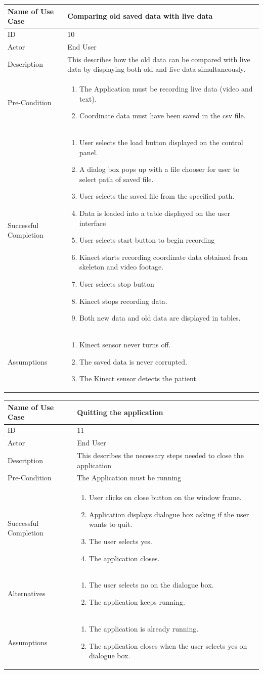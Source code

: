 \documentclass[a4paper, 12pt]{article}
\newcommand\addrow[2]{#1 &#2\\ }
\newcommand\addheading[2]{#1 &#2\\ \hline}
\newcommand\tabularhead{\begin{tabular}{lp{8cm}}
\hline
}
\newcommand\addmulrow[2]{ \begin{minipage}[t][][t]{2.5cm}#1\end{minipage}%
   &\begin{minipage}[t][][t]{8cm}
    \begin{enumerate} #2   \end{enumerate}
    \end{minipage}\\ }
\newenvironment{usecase}{\tabularhead}
{\hline\end{tabular}}
\begin{document}
\begin{usecase}
	\addheading{Name of Use Case}{Comparing old saved data with live data}
	\addrow{ID}{10}
	\addrow{Actor}{End User}
	\addrow{Description}{This describes how the old data can be compared with live data by displaying both old and live data simultaneously.}
	\addmulrow{Pre-Condition}{
	\item The Application must be recording live data (video and text).
	\item Coordinate data must have been saved in the csv file.}							
	\addmulrow{Successful Completion}{
		\item User selects the load button displayed on the control panel. 
		\item A dialog box pops up with a file chooser for user to select path of saved file.
		\item User selects the saved file from the specified path. 
		\item Data is loaded into a table displayed on the user interface
		\item User selects start button to begin recording
		\item Kinect starts recording coordinate data obtained from skeleton and video footage.
		\item User selects stop button
		\item Kinect stops recording data. 
		\item Both new data and old data are displayed in tables.}
	\addmulrow{Assumptions}{
	\item Kinect sensor never turns off. 
	\item The saved data is never corrupted.
	\item The Kinect sensor detects the patient}
\end{usecase}


\begin{usecase}
	\addheading{Name of Use Case}{Quitting the application}
	\addrow{ID}{11}
	\addrow{Actor}{End User}
	\addrow{Description}{This describes the necessary steps needed to close the application}
	\addrow{Pre-Condition}{The Application must be running}
	\addmulrow{Successful Completion}{
		\item User clicks on close button on the window frame. 
		\item Application displays dialogue box asking if the user wants to quit.  
		\item The user selects yes.
		\item The application closes.}
	\addmulrow{Alternatives}{
	\item The user selects no on the dialogue box. 
	\item The application keeps running.}
	\addmulrow{Assumptions}{
	\item The application is already running. 
	\item The application closes when the user selects yes on dialogue box.}
\end{usecase}
\end{document}
